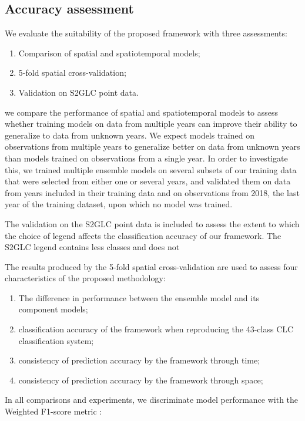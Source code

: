 \subsection*{Accuracy assessment}
    We evaluate the suitability of the proposed framework with three assessments:
    \begin{enumerate}
        \item Comparison of spatial and spatiotemporal models;
        \item 5-fold spatial cross-validation;
        \item Validation on S2GLC point data.
    \end{enumerate}
    
    we compare the performance of spatial and spatiotemporal models to assess whether training models on data from multiple years can improve their ability to generalize to data from unknown years. We expect models trained on observations from multiple years to generalize better on data from unknown years than models trained on observations from a single year. In order to investigate this, we trained multiple ensemble models on several subsets of our training data that were selected from either one or several years, and validated them on data from years included in their training data and on observations from 2018, the last year of the training dataset, upon which no model was trained.
    
    The validation on the S2GLC point data is included to assess the extent to which the choice of legend affects the classification accuracy of our framework. The S2GLC legend contains less classes and does not 

    The results produced by the 5-fold spatial cross-validation are used to assess four characteristics of the proposed methodology:
    \begin{enumerate}
        \item The difference in performance between the ensemble model and its component models;
        \item classification accuracy of the framework when reproducing the 43-class CLC classification system;
        \item consistency of prediction accuracy by the framework through time;
        \item consistency of prediction accuracy by the framework through space;
    \end{enumerate}
    
    In all comparisons and experiments, we discriminate model performance with the Weighted F1-score metric \citep{van1980information}:
    
